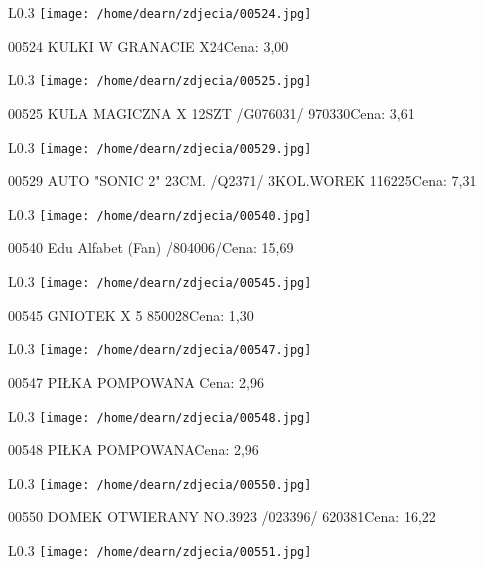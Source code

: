 \begin{wrapfigure}{L}{0.3\textwidth}
\texttt{[image: /home/dearn/zdjecia/00524.jpg]}
\end{wrapfigure}
00524 KULKI W GRANACIE X24Cena: 3,00\newline
\begin{wrapfigure}{L}{0.3\textwidth}
\texttt{[image: /home/dearn/zdjecia/00525.jpg]}
\end{wrapfigure}
00525 KULA MAGICZNA  X 12SZT /G076031/                970330Cena: 3,61\newline
\begin{wrapfigure}{L}{0.3\textwidth}
\texttt{[image: /home/dearn/zdjecia/00529.jpg]}
\end{wrapfigure}
00529 AUTO "SONIC 2"  23CM. /Q2371/ 3KOL.WOREK        116225Cena: 7,31\newline
\begin{wrapfigure}{L}{0.3\textwidth}
\texttt{[image: /home/dearn/zdjecia/00540.jpg]}
\end{wrapfigure}
00540 Edu Alfabet (Fan) /804006/Cena: 15,69\newline
\begin{wrapfigure}{L}{0.3\textwidth}
\texttt{[image: /home/dearn/zdjecia/00545.jpg]}
\end{wrapfigure}
00545 GNIOTEK  X 5                                    850028Cena: 1,30\newline
\begin{wrapfigure}{L}{0.3\textwidth}
\texttt{[image: /home/dearn/zdjecia/00547.jpg]}
\end{wrapfigure}
00547 PIŁKA POMPOWANA Cena: 2,96\newline
\begin{wrapfigure}{L}{0.3\textwidth}
\texttt{[image: /home/dearn/zdjecia/00548.jpg]}
\end{wrapfigure}
00548 PIŁKA POMPOWANACena: 2,96\newline
\begin{wrapfigure}{L}{0.3\textwidth}
\texttt{[image: /home/dearn/zdjecia/00550.jpg]}
\end{wrapfigure}
00550 DOMEK OTWIERANY NO.3923  /023396/               620381Cena: 16,22\newline
\begin{wrapfigure}{L}{0.3\textwidth}
\texttt{[image: /home/dearn/zdjecia/00551.jpg]}
\end{wrapfigure}
